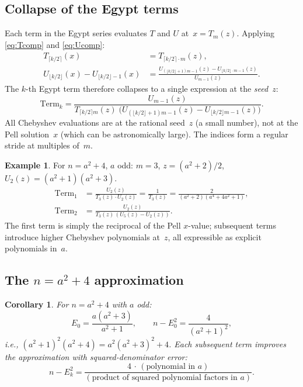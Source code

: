 \documentclass[11pt]{article}
\newtheorem{corollary}[theorem]{Corollary}
\theoremstyle{definition}
\newtheorem{example}[theorem]{Example}
\theoremstyle{remark}
\begin{document}
\subsection{Collapse of the Egypt terms}

Each term in the Egypt series evaluates $T$ and $U$ at~$x = T_m(z)$.
Applying \eqref{eq:Tcomp} and \eqref{eq:Ucomp}:
\begin{align*}
T_{\lceil k/2\rceil}(x) &= T_{\lceil k/2\rceil \cdot m}(z),
\\[3pt]
U_{\lfloor k/2\rfloor}(x) - U_{\lfloor k/2\rfloor - 1}(x)
&= \frac{U_{(\lfloor k/2\rfloor + 1)m - 1}(z)
       - U_{\lfloor k/2\rfloor \cdot m - 1}(z)}{U_{m-1}(z)}.
\end{align*}
The $k$-th Egypt term therefore collapses to a single expression
at the \emph{seed}~$z$:
\begin{equation}\label{eq:egyptcollapse}
\text{Term}_k
= \frac{U_{m-1}(z)}{
  T_{\lceil k/2\rceil m}(z)\;\bigl(
    U_{(\lfloor k/2\rfloor+1)m-1}(z)
  - U_{\lfloor k/2\rfloor m - 1}(z)\bigr)}.
\end{equation}
All Chebyshev evaluations are at the rational seed~$z$
(a small number), not at the Pell solution~$x$ (which can
be astronomically large).  The indices form a regular stride
at multiples of~$m$.

\begin{example}
For $n = a^2 + 4$, $a$ odd: $m = 3$, $z = (a^2+2)/2$,
$U_2(z) = (a^2+1)(a^2+3)$.
\begin{align*}
\mathrm{Term}_1
&= \frac{U_2(z)}{T_3(z) \cdot U_2(z)} = \frac{1}{T_3(z)}
 = \frac{2}{(a^2+2)(a^4+4a^2+1)},
\\[4pt]
\mathrm{Term}_2
&= \frac{U_2(z)}{T_3(z)\,(U_5(z) - U_2(z))}.
\end{align*}
The first term is simply the reciprocal of the Pell $x$-value;
subsequent terms introduce higher Chebyshev polynomials at~$z$,
all expressible as explicit polynomials in~$a$.
\end{example}

\subsection{The $n = a^2+4$ approximation}

\begin{corollary}\label{cor:sqrt4}
For $n = a^2 + 4$ with $a$ odd:
\[
E_0 = \frac{a(a^2+3)}{a^2+1}, \qquad
n - E_0^2 = \frac{4}{(a^2+1)^2},
\]
i.e., $(a^2+1)^2(a^2+4) = a^2(a^2+3)^2 + 4$.
Each subsequent term improves the approximation with
squared-denominator error:
\[
n - E_k^2 = \frac{4\,\cdot\, (\text{polynomial in } a)}{
(\text{product of squared polynomial factors in } a)}.
\]
\end{corollary}
\end{document}
